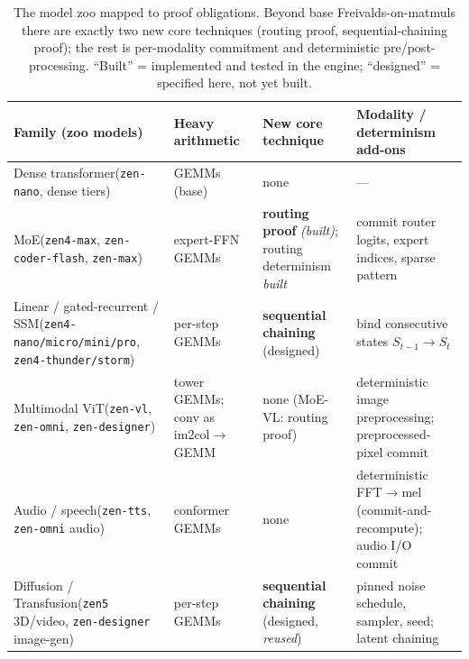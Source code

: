 \begin{table}[t]
\centering
\caption{The \Zoo{} model zoo mapped to proof obligations. Beyond base
Freivalds-on-matmuls there are exactly two new core techniques (routing proof,
sequential-chaining proof); the rest is per-modality commitment and deterministic
pre/post-processing. ``Built'' = implemented and tested in the engine; ``designed'' =
specified here, not yet built.}
\label{tab:families}
\scriptsize
\begin{tabular}{@{}p{2.6cm}p{2.9cm}p{3.0cm}p{3.1cm}@{}}
\toprule
Family (zoo models) & Heavy arithmetic & New core technique & Modality / determinism add-ons \\
\midrule
Dense transformer\newline(\texttt{zen-nano}, dense tiers)
  & GEMMs (base)
  & none
  & --- \\[3pt]
MoE\newline(\texttt{zen4-max}, \texttt{zen-coder-flash}, \texttt{zen-max})
  & expert-FFN GEMMs
  & \textbf{routing proof} \emph{(built)}; routing determinism \emph{built}
  & commit router logits, expert indices, sparse pattern \\[3pt]
Linear / gated-recurrent / SSM\newline(\texttt{zen4-nano/micro/mini/pro}, \texttt{zen4-thunder/storm})
  & per-step GEMMs
  & \textbf{sequential chaining} (designed)
  & bind consecutive states $S_{t-1}\!\to\!S_t$ \\[3pt]
Multimodal ViT\newline(\texttt{zen-vl}, \texttt{zen-omni}, \texttt{zen-designer})
  & tower GEMMs; conv as im2col$\to$GEMM
  & none (MoE-VL: routing proof)
  & deterministic image preprocessing; preprocessed-pixel commit \\[3pt]
Audio / speech\newline(\texttt{zen-tts}, \texttt{zen-omni} audio)
  & conformer GEMMs
  & none
  & deterministic FFT$\to$mel (commit-and-recompute); audio I/O commit \\[3pt]
Diffusion / Transfusion\newline(\texttt{zen5} 3D/video, \texttt{zen-designer} image-gen)
  & per-step GEMMs
  & \textbf{sequential chaining} (designed, \emph{reused})
  & pinned noise schedule, sampler, seed; latent chaining \\
\bottomrule
\end{tabular}
\end{table}

